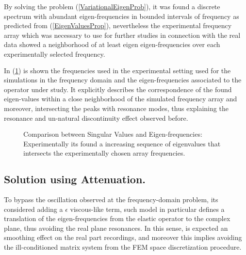By solving the problem (\ref{VariationalEigenProb}), it was found a discrete spectrum with abundant eigen-frequencies in bounded intervals of frequency as predicted from (\ref{EigenValuesProp}), nevertheless the experimental frequency array which was necessary to use for further studies in connection with the real data showed a neighborhood of at least eigen eigen-frequencies over each experimentally selected frequency. 

In (\ref{EigenValuesComparison}) is shown the frequencies used in the experimental setting used for the simulations in the frequency domain and the eigen-frequencies associated to the operator under study. It explicitly describes the correspondence of the found eigen-values within a close neighborhood of the simulated frequency array and moreover, intersecting the peaks with resonance modes, thus explaining the resonance and un-natural discontinuity effect observed before.

\begin{figure}[!h]%
    \centering
    \qquad
    \caption{Comparison between Singular Values and Eigen-frequencies: Experimentally its found a increasing sequence of eigenvalues that intersects the experimentally chosen array frequencies.}%
    \label{EigenValuesComparison}%
\end{figure}


\subsection{Solution using Attenuation.}
To bypass the oscillation observed at the frequency-domain problem, its considered adding a $\epsilon$ viscous-like term, such model in particular defines a translation of the eigen-frequencies from the elastic operator to the complex plane, thus avoiding the real plane resonances. In this sense, is expected an smoothing effect on the real part recordings, and moreover this implies avoiding the ill-conditioned matrix system from the FEM space discretization procedure.

